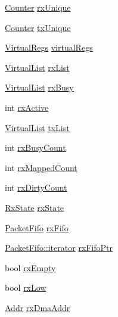 \begin{DoxyCompactItemize}
\begin{tabbing}
\end{tabbing}\item 
\hyperlink{base_2types_8hh_ae1475755791765b8e6f6a8bb091e273e}{Counter} \hyperlink{classSinic_1_1Device_a98e0c2747f2107c6f81f51e9ba3bdc8a}{rxUnique}
\item 
\hyperlink{base_2types_8hh_ae1475755791765b8e6f6a8bb091e273e}{Counter} \hyperlink{classSinic_1_1Device_addcc8e87969e32011941cd144fe23c73}{txUnique}
\item 
\hyperlink{classstd_1_1vector}{VirtualRegs} \hyperlink{classSinic_1_1Device_acb438fcaae56ab29f35376e8b0726c23}{virtualRegs}
\item 
\hyperlink{classstd_1_1list}{VirtualList} \hyperlink{classSinic_1_1Device_a45202257b5522a1436d8130249ee0a0d}{rxList}
\item 
\hyperlink{classstd_1_1list}{VirtualList} \hyperlink{classSinic_1_1Device_afd33bf96a9045d1f90d0685ad3e33253}{rxBusy}
\item 
int \hyperlink{classSinic_1_1Device_a560efaee55571ea588551a80aadc6cda}{rxActive}
\item 
\hyperlink{classstd_1_1list}{VirtualList} \hyperlink{classSinic_1_1Device_a7010216dd085a0c2dac9d6b830a64f35}{txList}
\item 
int \hyperlink{classSinic_1_1Device_a508dbc989a9476f10e7622b054aac7e1}{rxBusyCount}
\item 
int \hyperlink{classSinic_1_1Device_a41d5a12c120010c50c75ea0dc2f01241}{rxMappedCount}
\item 
int \hyperlink{classSinic_1_1Device_a9e5a18ec7025db57fa6ff2f05a289804}{rxDirtyCount}
\item 
\hyperlink{classSinic_1_1Device_afa22e66eb5ea0daab0f0cd0360936f82}{RxState} \hyperlink{classSinic_1_1Device_a17c506ad3a705ec9dbd1762e6a80fbf5}{rxState}
\item 
\hyperlink{classPacketFifo}{PacketFifo} \hyperlink{classSinic_1_1Device_a45c9c6a3665bcd91e57ff35aa9089fa7}{rxFifo}
\item 
\hyperlink{classPacketFifo_a6905b6d8863a2eecd86b633802b68fda}{PacketFifo::iterator} \hyperlink{classSinic_1_1Device_aee345bc47c94b616b04d8f502dab1826}{rxFifoPtr}
\item 
bool \hyperlink{classSinic_1_1Device_a62b6a5f468811226da2581374919b1a5}{rxEmpty}
\item 
bool \hyperlink{classSinic_1_1Device_a1ef589f4a0a6d9baae11626a0d89b5ec}{rxLow}
\item 
\hyperlink{base_2types_8hh_af1bb03d6a4ee096394a6749f0a169232}{Addr} \hyperlink{classSinic_1_1Device_a4a609f84c6849bcfb6dee08329773fca}{rxDmaAddr}

\end{DoxyCompactItemize}
